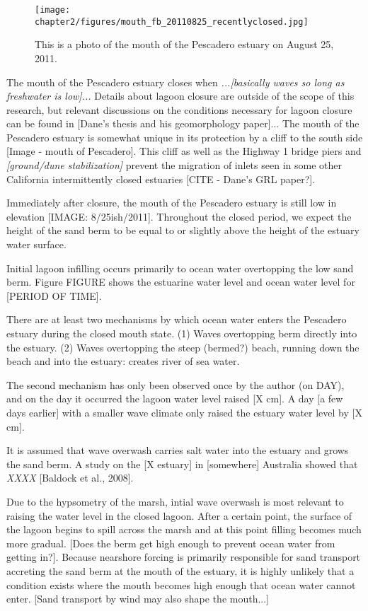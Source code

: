 \begin{figure}
  \texttt{[image: chapter2/figures/mouth\_fb\_20110825\_recentlyclosed.jpg]}
    \caption{This is a photo of the mouth of the Pescadero estuary on August 25, 2011.}
 \label{mouth_fb_20110825}
 \end{figure}


The mouth of the Pescadero estuary closes when \emph{...[basically waves so long as freshwater is low]...} Details about lagoon closure are outside of the scope of this research, but relevant discussions on the conditions necessary for lagoon closure can be found in [Dane's thesis and his geomorphology paper]... The mouth of the Pescadero estuary is somewhat unique in its protection by a cliff to the south side [Image - mouth of Pescadero]. This cliff as well as the Highway 1 bridge piers and \emph{[ground/dune stabilization]} prevent the migration of inlets seen in some other California intermittently closed estuaries [CITE - Dane's GRL paper?]. 

Immediately after closure, the mouth of the Pescadero estuary is still low in elevation [IMAGE: 8/25ish/2011]. Throughout the closed period, we expect the height of the sand berm to be equal to or slightly above the height of the estuary water surface.

Initial lagoon infilling occurs primarily to ocean water overtopping the low sand berm. Figure {FIGURE} shows the estuarine water level and ocean water level for [PERIOD OF TIME]. 

There are at least two mechanisms by which ocean water enters the Pescadero estuary during the closed mouth state.
(1) Waves overtopping berm directly into the estuary.
(2) Waves overtopping the steep (bermed?) beach, running down the beach and into the estuary: creates river of sea water. 

The second mechanism has only been observed once by the author (on DAY), and on the day it occurred the lagoon water level raised [X cm]. A day [a few days earlier] with a smaller wave climate only raised the estuary water level by [X cm]. 

It is assumed that wave overwash carries salt water into the estuary and grows the sand berm. A study on the [X estuary] in [somewhere] Australia showed that \emph{XXXX} [Baldock et al., 2008]. 



Due to the hypsometry of the marsh, intial wave overwash is most relevant to raising the water level in the closed lagoon. After a certain point, the surface of the lagoon begins to spill across the marsh and at this point filling becomes much more gradual. [Does the berm get high enough to prevent ocean water from getting in?]. Because nearshore forcing is primarily responsible for sand transport accreting the sand berm at the mouth of the estuary, it is highly unlikely that a condition exists where the mouth becomes high enough that ocean water cannot enter. [Sand transport by wind may also shape the mouth...]


